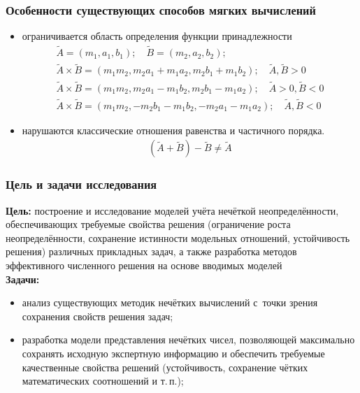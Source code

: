 \documentclass[12pt]{beamer}
\begin{document}
\begin{frame}
  \frametitle{Особенности существующих способов мягких вычислений}
  \begin{itemize}
    \item ограничивается область определения функции принадлежности
    \begin{gather*}
      \tilde A = \left( {{m}_{1}},{{a}_{1}},{{b}_{1}} \right); \quad \tilde B = \left( {{m}_{2}},{{a}_{2}},{{b}_{2}} \right); \\
      \tilde A \times \tilde B=\left( {{m}_{1}}{{m}_{2}},{{m}_{2}}{{a}_{1}}+{{m}_{1}}{{a}_{2}},{{m}_{2}}{{b}_{1}}+{{m}_{1}}{{b}_{2}} \right);\quad \tilde A, \tilde B > 0\\
      \tilde A \times \tilde B =\left( {{m}_{1}}{{m}_{2}},{{m}_{2}}{{a}_{1}}-{{m}_{1}}{{b}_{2}},{{m}_{2}}{{b}_{1}}-{{m}_{1}}{{a}_{2}} \right); \quad \tilde A> 0, \tilde B < 0\\
      \tilde A \times \tilde B=\left( {{m}_{1}}{{m}_{2}},-{{m}_{2}}{{b}_{1}}-{{m}_{1}}{{b}_{2}},-{{m}_{2}}{{a}_{1}}-{{m}_{1}}{{a}_{2}} \right); \quad \tilde A, \tilde B < 0
    \end{gather*}
    \item нарушаются классические отношения равенства и частичного порядка.
    \begin{gather*}
      \left( \tilde A + \tilde B \right) - \tilde B \neq \tilde A
    \end{gather*}

  \end{itemize}
\end{frame}



\begin{frame}
  \frametitle{Цель и задачи исследования}
  \textbf{Цель:} построение и исследование моделей учёта нечёткой неопределённости, обеспечивающих требуемые свойства решения (ограничение роста неопределённости, сохранение истинности модельных отношений, устойчивость решения) различных прикладных задач, а также разработка методов эффективного численного решения на основе вводимых моделей \\
  \textbf{Задачи:}
  \begin{itemize}
    \item анализ существующих методик нечётких вычислений с~точки зрения сохранения свойств решения задач;
    \item разработка модели представления нечётких чисел, позволяющей максимально сохранять исходную экспертную информацию и обеспечить требуемые качественные свойства решений (устойчивость, сохранение чётких математических соотношений и т.\,п.);
  \end{itemize}  
\end{frame}
\end{document}

